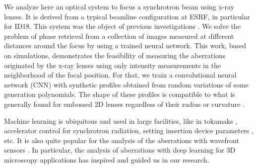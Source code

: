 \documentclass[preprint]{iucr}
\newcommand{\todo}[1]{{\color{red}[TODO: "#1'']}}
\newcommand{\inred}[1]{{\color{red}#1}}
\begin{document}
We analyze here an optical system to focus a synchrotron beam using x-ray lenses. It is derived from a typical beamline configuration at ESRF, in particular for ID18. This system was the object of previous investigations \cite{multioptics}. We solve the problem of phase retrieval from a collection of images measured at different distances around the focus by using a trained neural network. This work, based on simulations, demonstrates the feasibility of measuring the aberrations originated by the x-ray lenses using only intensity measurements in the neighborhood of the focal position. For that, we train a convolutional neural network (CNN) with synthetic profiles obtained from random variations of some generation polynomials. \inred{The shape of these profiles is compatible to what is generally found for embossed 2D lenses \cite{Roth2017} regardless of their radius or curvature \cite{Celestre2020, Seiboth2020, Dhamgaye2020, Celestre:yi5119}.}

Machine learning is ubiquitous and used in large facilities, like in tokamaks \cite{Degrave2022-ip}, accelerator control \cite{ML_acc_edelen2020} for synchrotron radiation,  setting insertion device parameters \cite{Sheppard:yi5121}, etc. It is also quite popular for the analysis of the aberrations with wavefront sensors \cite{Nishizaki:19, Mockl2019-sr, Vanberg2019}. 
In particular, the analysis of aberrations with deep learning for 3D microscopy applications \cite{Saha2020} has inspired and guided us in our research.     



\end{document}
